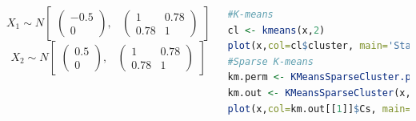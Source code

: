 \documentclass{beamer}
\begin{document}
\begin{frame}[fragile]
\begin{columns}[c]
\begin{equation*}
X_1 \sim N
\begin{bmatrix}
\begin{pmatrix}
-0.5\\
0
\end{pmatrix}\!\!,&
\begin{pmatrix}
1 & 0.78 \\
0.78 & 1
\end{pmatrix}
\end{bmatrix}
\end{equation*}
\begin{equation*}
X_2 \sim N
\begin{bmatrix}
\begin{pmatrix}
0.5\\
0
\end{pmatrix}\!\!,&
\begin{pmatrix}
1 & 0.78 \\
0.78 & 1
\end{pmatrix}
\end{bmatrix}
\end{equation*}

\begin{lstlisting}[language=R]
#K-means
cl <- kmeans(x,2)
plot(x,col=cl$cluster, main='Standard K-means')
#Sparse K-means
km.perm <- KMeansSparseCluster.permute(x,K=2,wbounds=seq(3,7,len=15),nperms=5)
km.out <- KMeansSparseCluster(x,K=2,wbounds=km.perm$bestw)
plot(x,col=km.out[[1]]$Cs, main='Sparse K-means')
\end{lstlisting}
\end{columns}
\end{frame}

\end{document}

